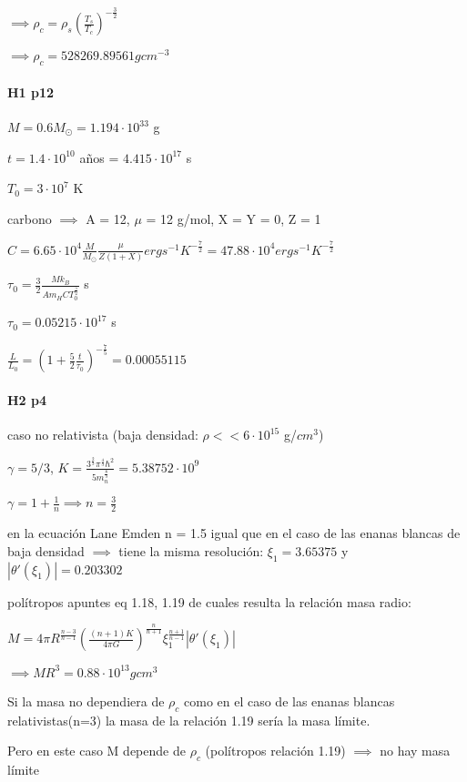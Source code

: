 \documentclass[12pt]{book}
\begin{document}
$\implies \rho_c = \rho_s (\frac{T_s}{T_c})^{-\frac{3}{2}} $

$\implies \rho_c = 528269.89561g cm^{-3} $

\paragraph{H1 p12}

$M = 0.6 M_{\odot} = 1.194 \cdot 10^{33}$ g

$t = 1.4 \cdot 10^{10}$ años = $4.415 \cdot 10^{17}$ s

$T_0 = 3 \cdot 10^7$ K

carbono $\implies$ A = 12, $\mu$ = 12 g/mol, X = Y = 0, Z = 1

$C = 6.65 \cdot 10^4 \frac{M}{M_{\odot}} \frac{\mu}{Z(1+X)} erg s^{-1}K^{-\frac{7}{2}} = 47.88 \cdot 10^4  erg s^{-1}K^{-\frac{7}{2}}$ 

$\tau_0 = \frac{3}{2} \frac{M k_B}{A m_H C T_0^{\frac{5}{2}}}$ s

$\tau_0 = 0.05215 \cdot 10^{17}$ s

$\frac{L}{L_0} = (1+\frac{5}{2} \frac{t}{\tau_0} )^{-\frac{7}{5}} = 0.00055115$

\paragraph{H2 p4}

caso no relativista (baja densidad: $\rho << 6  \cdot 10^{15} $ g/$cm^3$)

$\gamma = 5/3$, $K = \frac{3^{\frac{2}{3}} \pi^{\frac{4}{3}} \hbar^2 }{5 m_n^{\frac{8}{3}}} = 5.38752 \cdot 10^9$

$\gamma = 1 + \frac{1}{n} \implies n = \frac{3}{2}$

en la ecuación Lane Emden n = 1.5 igual que en el caso de las enanas blancas  de baja densidad $\implies $ tiene la misma resolución:
$\xi_1= 3.65375$ y $|\theta'(\xi_1)|= 0.203302$  

polítropos apuntes eq 1.18, 1.19 de cuales resulta la relación masa radio:

$M = 4 \pi R^{\frac{n-3}{n-1}} (\frac{(n+1)K}{4\pi G})^{\frac{n}{n+1}} \xi_1^{\frac{n+1}{n-1}} |\theta'(\xi_1)| $

$\implies M R^3 = 0.88 \cdot 10^{13} g cm^3$

Si la masa no dependiera de $\rho_c$ como en el caso de las enanas blancas relativistas(n=3) la masa de la relación 1.19 sería la masa límite.

Pero en este caso M depende de $\rho_c$ (polítropos relación 1.19) $\implies$ no hay masa límite
\end{document}
